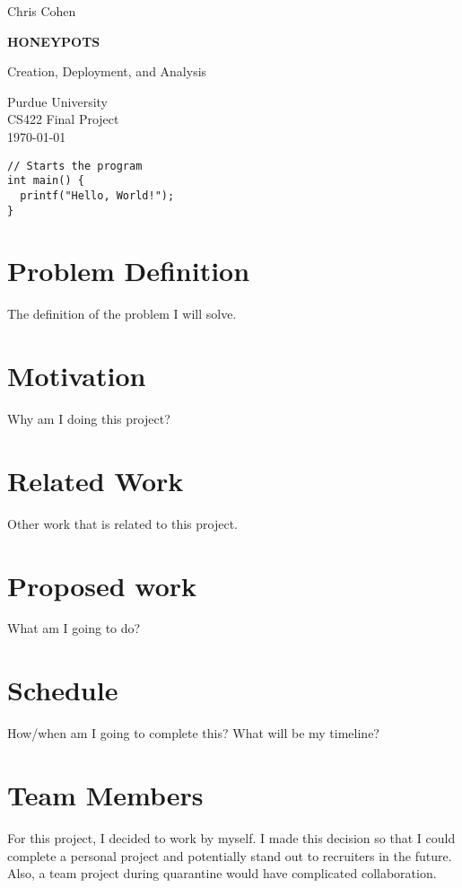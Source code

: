 \documentclass[12pt]{article}
\begin{document}
\begin{titlepage}
    \begin{center}
        \vspace*{1cm}
        \large
        Chris Cohen

        \vspace{6cm}
        \HUGE
        \textbf{HONEYPOTS}
            
        \Large
        Creation, Deployment, and Analysis\\
            
        \vfill
            
        \normalsize
        Purdue University\\
        CS422 Final Project\\
        \today
            
    \end{center}
\end{titlepage}


\begin{lstlisting}
// Starts the program
int main() {
  printf("Hello, World!");
}
\end{lstlisting}


\section{Problem Definition}
The definition of the problem I will solve.

\section{Motivation}
Why am I doing this project?

\section{Related Work}
Other work that is related to this project.

\section{Proposed work}
What am I going to do?

\section{Schedule}
How/when am I going to complete this? What will be my timeline?

\section{Team Members}
For this project, I decided to work by myself. I made this decision so that I could complete a personal project and potentially stand out to recruiters in the future. Also, a team project during quarantine would have complicated collaboration.


\clearpage
\printbibliography
\end{document}
